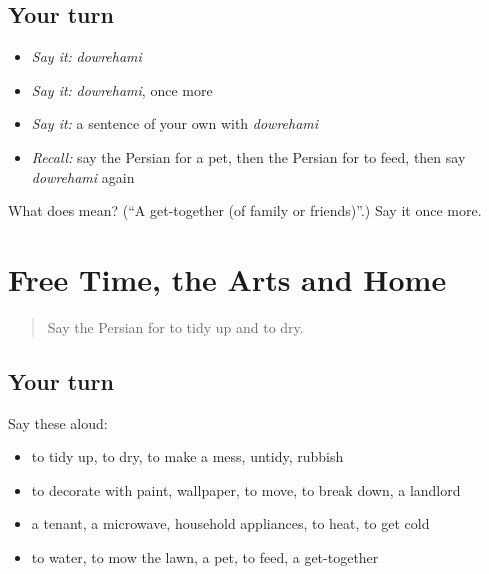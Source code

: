 \subsection*{Your turn}
\begin{itemize}
\raggedright
  \item \emph{Say it:} \emph{dowrehami}
  \item \emph{Say it:} \emph{dowrehami}, once more
  \item \emph{Say it:} a sentence of your own with \emph{dowrehami}
  \item \emph{Recall:} say the Persian for a pet, then the Persian for to feed, then say \emph{dowrehami} again
\end{itemize}

\begin{tcolorbox}[breakable,colback=teal!4,colframe=teal!35!black,title={Before you move on}]
What does  mean? (\textquotedblleft{}A get-together (of family or friends)\textquotedblright{}.) Say it once more.
\end{tcolorbox}
\section[(dialogue)]{Free Time, the Arts and Home}

\label{lesson:FA-R539-review-536-539}



\begin{quote}
Say the Persian for to tidy up and to dry.
\end{quote}

\subsection*{Your turn}
Say these aloud:

\begin{itemize}
\raggedright
  \item to tidy up, to dry, to make a mess, untidy, rubbish
  \item to decorate with paint, wallpaper, to move, to break down, a landlord
  \item a tenant, a microwave, household appliances, to heat, to get cold
  \item to water, to mow the lawn, a pet, to feed, a get-together
\end{itemize}

